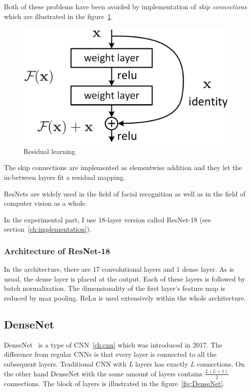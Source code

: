 Both of these problems have been avoided by implementation of \textit{skip connections} which are illustrated in the
figure~\ref{fig:ResNet}.

\begin{figure}[H]
    \centering
    \includegraphics[width=0.9\columnwidth]{images/face-recognition/resnet.png}
    \caption{Residual learning~\cite{ResNet}}
    \label{fig:ResNet}
\end{figure}

The skip connections are implemented as elementwise addition and they let the in-between layers fit a residual mapping.

ResNets are widely used in the field of facial recognition as well as in the field of computer vision as a whole.

In the experimental part, I use 18-layer version called ResNet-18 (see section~\ref{ch:implementation}).

\subsubsection{Architecture of ResNet-18}\label{subsubsec:resnet18}
In the architecture, there are 17 convolutional layers and 1 dense layer.
As is usual, the dense layer is placed at the output.
Each of these layers is followed by batch normalization.
The dimensionality of the first layer's feature map is reduced by max pooling.
ReLu is used extensively within the whole architecture.

\subsection{DenseNet}\label{subsec:densenet}
DenseNet~\cite{DenseNet} is a type of CNN~\ref{ch:cnn} which was introduced in 2017.
The difference from regular CNNs is that every layer is connected to all the subsequent layers.
Traditional CNN with \textit{L} layers has exactly \textit{L} connections.
On the other hand DenseNet with the same amount of layers contains $\frac{L\left( L+1 \right)}{2}$ connections.
The block of layers is illustrated in the figure~\ref{fig:DenseNet}.

